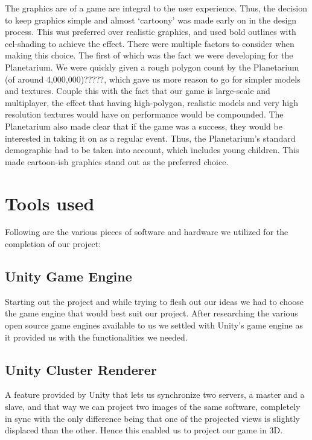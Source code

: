 \documentclass[11pt,a4paper]{article}
\begin{document}
        The graphics are of a game are integral to the user experience. Thus, the decision to keep graphics simple and almost ‘cartoony’ was made early on in the design process. This was preferred over realistic graphics, and used bold outlines with cel-shading to achieve the effect. There were multiple factors to consider when making this choice. The first of which was the fact we were developing for the Planetarium. We were quickly given a rough polygon count by the Planetarium (of around 4,000,000)?????, which gave us more reason to go for simpler models and textures. Couple this with the fact that our game is large-scale and multiplayer, the effect that having high-polygon, realistic models and very high resolution textures would have on performance would be compounded. The Planetarium also made clear that if the game was a success, they would be interested in taking it on as a regular event. Thus, the Planetarium’s standard demographic had to be taken into account, which includes young children. This made cartoon-ish graphics stand out as the preferred choice. 

        \section{Tools used}
        Following are the various pieces of software and hardware we utilized for the completion of our project:

        \subsection{Unity Game Engine}

        Starting out the project and while trying to flesh out our ideas we had to choose the game engine that would best suit our project. After researching the various open source game engines available to us we settled with Unity’s game engine as it provided us with the functionalities we needed.

        \subsection{Unity Cluster Renderer}

        A feature provided by Unity that lets us synchronize two servers, a master and a slave, and that way we can project two images of the same software, completely in sync with the only difference being that one of the projected views is slightly displaced than the other. Hence this enabled us to project our game in 3D.
\end{document}

